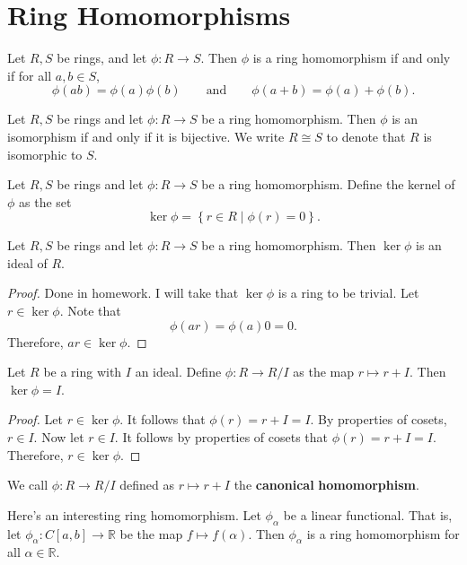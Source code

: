 \chapter{Ring Homomorphisms}
\begin{definition}\label{dfn:RingHomo}
	Let $R,S$ be rings, and let $\phi : R \to S$. Then $\phi $ is a ring homomorphism if and only if for all $a,b\in S$,
	\[
		\phi (ab)=\phi (a)\phi (b)\qquad \text{and}\qquad \phi (a+b)=\phi (a)+\phi (b)
	.\]
\end{definition}
\begin{definition}\label{dfn:RingIso}
	Let $R,S$ be rings and let $\phi : R \to S$ be a ring homomorphism. Then $\phi $ is an isomorphism if and only if it is bijective. We write $R\cong S$ to denote that $R$ is isomorphic to $S$.
\end{definition}
\begin{definition}[Kernel]\label{dfn:RingKer}
	Let $R,S$ be rings and let $\phi : R \to S$ be a ring homomorphism. Define the kernel of $\phi $ as the set
	\[
		\ker \phi =\left\{ r\in R \mid \phi (r)=0 \right\} 
	.\]
\end{definition}
\begin{proposition}
	Let $R,S$ be rings and let $\phi : R \to S$ be a ring homomorphism. Then $\ker \phi $ is an ideal of $R$.
\end{proposition}
\begin{proof}
	Done in homework. I will take that $\ker \phi $ is a ring to be trivial. Let $r\in \ker \phi $. Note that
	\[
		\phi (ar)=\phi (a)0=0
	.\]
	Therefore, $ar\in \ker \phi $.
\end{proof}
\begin{proposition}
	Let $R$ be a ring with $I$ an ideal. Define $\phi : R \to R /I$ as the map $r\mapsto r+I$. Then $\ker \phi =I$.
\end{proposition}
\begin{proof}
	Let $r\in \ker \phi $. It follows that $\phi (r)=r+I=I$. By properties of cosets, $r\in I$. Now let $r\in I$. It follows by properties of cosets that $\phi (r)=r+I=I$. Therefore, $r\in \ker \phi $.
\end{proof}
\begin{remark}
	We call $\phi : R \to R/I$ defined as $r\mapsto r+I$ the \textbf{canonical} \textbf{homomorphism}.
\end{remark}
Here's an interesting ring homomorphism. Let $\phi_\alpha $ be a linear functional. That is, let $\phi_\alpha : C[a,b] \to \mathbb{R}$ be the map $f\mapsto f(\alpha )$. Then  $\phi_\alpha $ is a ring homomorphism for all $\alpha \in\mathbb{R}$.

